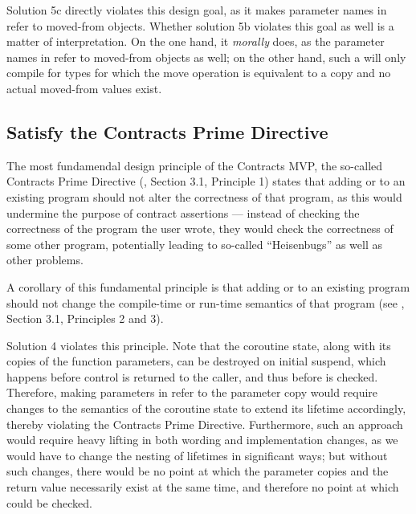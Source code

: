 Solution 5c directly violates this design goal, as it makes parameter names in  refer to moved-from objects. Whether solution 5b violates this goal as well is a matter of interpretation. On the one hand, it \emph{morally} does, as the parameter names in  refer to moved-from objects as well; on the other hand, such a  will only compile for types for which the move operation is equivalent to a copy and no actual moved-from values exist.
\subsection{Satisfy the Contracts Prime Directive}
\label{goal_prime_directive}

The most fundamendal design principle of the Contracts MVP, the so-called Contracts Prime Directive (\cite{P2900R8}, Section 3.1, Principle 1) states that adding  or  to an existing program should not alter the correctness of that program, as this would undermine the purpose of contract assertions --- instead of checking the correctness of the program the user wrote, they would check the correctness of some other program, potentially leading to so-called ``Heisenbugs'' as well as other problems.

A corollary of this fundamental principle is that adding  or  to an existing program should not change the compile-time or run-time semantics of that program (see \cite{P2900R8}, Section 3.1, Principles 2 and 3).

Solution 4 violates this principle. Note that the coroutine state, along with its copies of the function parameters, can be destroyed on initial suspend, which happens before control is returned to the caller, and thus before  is checked. Therefore, making parameters in  refer to the parameter copy would require changes to the semantics of the coroutine state to extend its lifetime accordingly, thereby violating the Contracts Prime Directive. Furthermore, such an approach would require heavy lifting in both wording and implementation changes, as we would have to change the nesting of lifetimes in significant ways; but without such changes, there would be no point at which the parameter copies and the return value necessarily exist at the same time, and therefore no point at which  could be checked.

